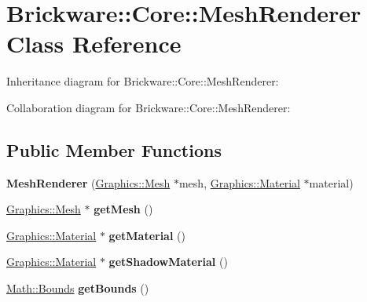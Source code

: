\hypertarget{classBrickware_1_1Core_1_1MeshRenderer}{}\section{Brickware\+:\+:Core\+:\+:Mesh\+Renderer Class Reference}
\label{classBrickware_1_1Core_1_1MeshRenderer}


Inheritance diagram for Brickware\+:\+:Core\+:\+:Mesh\+Renderer\+:


Collaboration diagram for Brickware\+:\+:Core\+:\+:Mesh\+Renderer\+:
\subsection*{Public Member Functions}
\begin{DoxyCompactItemize}
\item 
\hypertarget{classBrickware_1_1Core_1_1MeshRenderer_a9879468178c922a46a6e2257cb829c53}{}{\bfseries Mesh\+Renderer} (\hyperlink{classBrickware_1_1Graphics_1_1Mesh}{Graphics\+::\+Mesh} $\ast$mesh, \hyperlink{classBrickware_1_1Graphics_1_1Material}{Graphics\+::\+Material} $\ast$material)\label{classBrickware_1_1Core_1_1MeshRenderer_a9879468178c922a46a6e2257cb829c53}

\item 
\hypertarget{classBrickware_1_1Core_1_1MeshRenderer_a4697774c3df3992f3647494ed1b66b2d}{}\hyperlink{classBrickware_1_1Graphics_1_1Mesh}{Graphics\+::\+Mesh} $\ast$ {\bfseries get\+Mesh} ()\label{classBrickware_1_1Core_1_1MeshRenderer_a4697774c3df3992f3647494ed1b66b2d}

\item 
\hypertarget{classBrickware_1_1Core_1_1MeshRenderer_a75c264da40ce0ac85919736c2905203e}{}\hyperlink{classBrickware_1_1Graphics_1_1Material}{Graphics\+::\+Material} $\ast$ {\bfseries get\+Material} ()\label{classBrickware_1_1Core_1_1MeshRenderer_a75c264da40ce0ac85919736c2905203e}

\item 
\hypertarget{classBrickware_1_1Core_1_1MeshRenderer_a4c8e2693e2ef43465c264ad79a7c83d8}{}\hyperlink{classBrickware_1_1Graphics_1_1Material}{Graphics\+::\+Material} $\ast$ {\bfseries get\+Shadow\+Material} ()\label{classBrickware_1_1Core_1_1MeshRenderer_a4c8e2693e2ef43465c264ad79a7c83d8}

\item 
\hypertarget{classBrickware_1_1Core_1_1MeshRenderer_a92451375408d6ee721789ceecbf247d2}{}\hyperlink{classBrickware_1_1Math_1_1Bounds}{Math\+::\+Bounds} {\bfseries get\+Bounds} ()\label{classBrickware_1_1Core_1_1MeshRenderer_a92451375408d6ee721789ceecbf247d2}


\end{DoxyCompactItemize}
